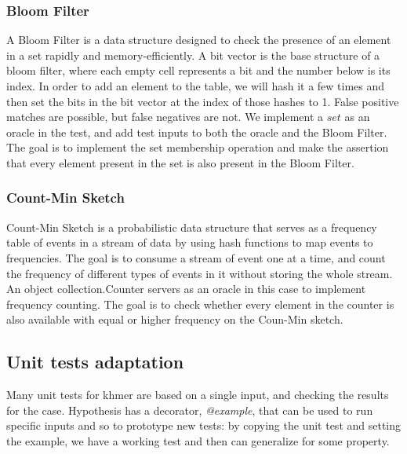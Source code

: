 \documentclass[preprint,nocopyrightspace]{sig-alternate}
\begin{document}
\subsubsection{Bloom Filter}
A Bloom Filter is a data structure designed to check the presence of an element in a set rapidly and memory-efficiently.
A bit vector is the base structure of a bloom filter,
where each empty cell represents a bit and the number below is its index.
In order to add an element to the table,
we will hash it a few times and then set the bits in the bit vector at the index of those hashes to 1.
False positive matches are possible,
but false negatives are not.
We implement a $set$ as an oracle in the test, and add test inputs to both the oracle and the Bloom Filter.
The goal is to implement the set membership operation and make the assertion that every element present in 
the set is also present in the Bloom Filter.

\subsubsection{Count-Min Sketch}
Count-Min Sketch is a probabilistic data structure that serves as a frequency table of events in a stream of data by using hash functions to map events to frequencies.
The goal is to consume a stream of event one at a time,
and count the frequency of different types of events in it without storing the whole stream.
An object collection.Counter servers as an oracle in this case to implement frequency counting.
The goal is to check whether every element in the counter is also available with equal or higher frequency on the Coun-Min sketch.

\subsection{Unit tests adaptation}
Many unit tests for khmer are based on a single input,
and checking the results for the case.
Hypothesis has a decorator,
\emph{@example},
that can be used to run specific inputs and so to prototype new tests:
by copying the unit test and setting the example,
we have a working test and then can generalize for some property.
\end{document}
